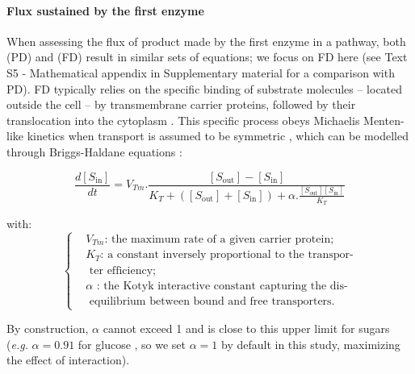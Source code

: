 \noindent \paragraph{Flux sustained by the first enzyme}

When assessing the flux of product made by the first enzyme in a pathway, both (PD) and (FD) result in similar sets of equations; we focus on FD here (see Text S5 - Mathematical appendix in Supplementary material for a comparison with PD). FD typically relies on the specific binding of substrate molecules -- located outside the cell -- by transmembrane carrier proteins, followed by their translocation into the cytoplasm \citep{danielli1954,Wilbrandt61,Kotyk67,Bosdriesz18}. This specific process obeys Michaelis Menten-like kinetics when transport is assumed to be symmetric \citep{Kotyk67}, which can be modelled through Briggs-Haldane equations \citep{Briggs25,Haldane30,Stein86d}:

\small
\begin{equation}
\frac{d[S_\text{in}]}{dt}=V_{Tm}.\frac{[S_\text{out}]-[S_\text{in}]}{K_T+([S_\text{out}]+[S_\text{in}])+\alpha.\frac{[S_\text{out}][S_\text{in}]}{K_T}}
\end{equation}
\normalsize

with:
\small
\begin{equation*}
  \left\{
      \begin{aligned}
		&V_{Tm}\text{: the maximum rate of a given carrier protein;}\\
		&K_T\text{: a constant inversely proportional to the transpor-}\\
		&\text{  ter efficiency};\\
		&\alpha \text{ : the Kotyk interactive constant  capturing the dis-}\\
		&\text{  equilibrium between bound and free transporters.}
      \end{aligned}
    \right.
\end{equation*}
\normalsize

By construction, $\alpha$ cannot exceed 1 \cite{Kotyk67} and is close to this upper limit for sugars (\textit{e.g.} $\alpha=0.91$ for glucose \citep{Teusink98}, so we set $\alpha=1$ by default in this study, maximizing the effect of interaction).

